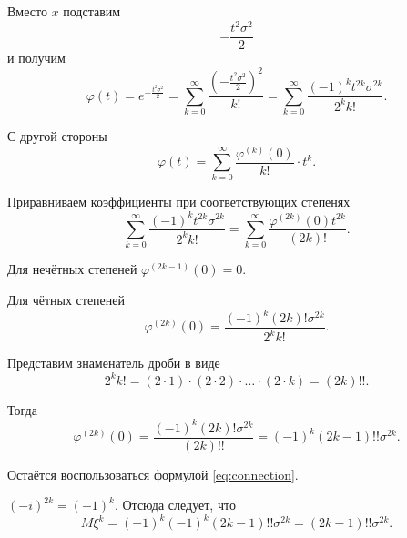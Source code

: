 Вместо $x$ подставим
$$- \frac{t^2 \sigma^2}{2}$$
и получим
$$ \varphi \left( t \right) =
  e^{- \frac{t^2 \sigma^2}{2}} =
  \sum \limits_{k = 0}^{ \infty } \frac{ \left( - \frac{t^2 \sigma^2}{2} \right)^2}{k!} =
  \sum \limits_{k = 0}^{ \infty } \frac{ \left( -1 \right)^k t^{2k} \sigma^{2k}}{2^k k!}.$$

С другой стороны
$$ \varphi \left( t \right) =
  \sum \limits_{k = 0}^{ \infty }
    \frac{ \varphi^{ \left( k \right) } \left( 0 \right) }{k!} \cdot t^k.$$

Приравниваем коэффициенты при соответствующих степенях
$$ \sum \limits_{k = 0}^{ \infty } \frac{ \left( -1 \right)^k t^{2k} \sigma^{2k}}{2^k k!} =
  \sum \limits_{k = 0}^{ \infty }
    \frac{ \varphi^{ \left( 2k \right) } \left( 0 \right) t^{2k}}{ \left( 2k \right)!}.$$

Для нечётных степеней $ \varphi^{ \left( 2k - 1 \right) } \left( 0 \right) = 0$.

Для чётных степеней
$$ \varphi^{ \left( 2k \right) } \left( 0 \right) =
  \frac{ \left( -1 \right)^k \left( 2k \right)! \sigma^{2k}}{2^k k!}.$$

Представим знаменатель дроби в виде
$$2^k k! =
  \left( 2 \cdot 1 \right) \cdot \left( 2 \cdot 2 \right) \cdot \dotsc \cdot
  \left( 2 \cdot k \right) =
  \left( 2k \right)!!.$$

Тогда
$$ \varphi^{ \left( 2k \right) } \left( 0 \right) =
  \frac{ \left( -1 \right)^k \left( 2k \right)! \sigma^{2k}}{ \left( 2k \right)!!} =
  \left( -1 \right)^k \left( 2k - 1 \right)!! \sigma^{2k}.$$

Остаётся воспользоваться формулой \eqref{eq:connection}.

$ \left( -i \right)^{2k} = \left( -1 \right)^k$.
Отсюда следует, что
$$M \xi^k =
  \left( -1 \right)^k \left( -1 \right)^k \left( 2k - 1 \right)!! \sigma^{2k} =
  \left( 2k - 1 \right)!! \sigma^{2k}.$$
